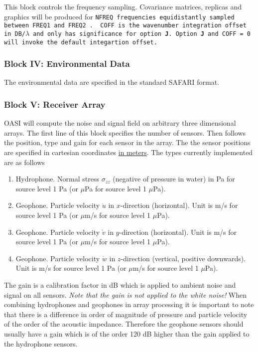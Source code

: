 This block controls the frequency sampling. Covariance matrices,
replicas and graphics will be produced for \tt NFREQ \rm frequencies
equidistantly sampled between \tt FREQ1 \rm and \tt FREQ2 \rm. \tt
COFF \rm is the wavenumber integration offset in DB/$\lambda$ and only
has significance for option {\bf J}. Option {\bf J} and \tt COFF = 0
\rm will invoke the default integartion offset.
 
\subsubsection{Block IV: Environmental Data }

The environmental data are specified in the standard SAFARI format.

\subsubsection{Block V: Receiver Array}

OASI will compute the noise and signal field on arbitrary
three dimensional arrays. The first line of this block specifies the
number of sensors. Then follows the position, type and gain for each
sensor in the array. The the sensor positions are specified in
cartesian coordinates \underline{in meters}. The types currently
implemented are as follows

\begin{enumerate}
\item Hydrophone. Normal stress $ \sigma_{zz}$ (negative of pressure in
water) in Pa for source level 1 Pa (or $\mu$Pa for source level 1 $\mu$Pa). 
\item Geophone. Particle velocity $\dot{u}$ in $x$-direction
(horizontal).  Unit is
m/s for source level 1 Pa (or $\mu$m/s for source level 1 $\mu$Pa).
\item Geophone. Particle velocity $\dot{v}$ in $y$-direction
(horizontal).  Unit is
m/s for source level 1 Pa (or $\mu$m/s for source level 1 $\mu$Pa).
\item Geophone. Particle velocity $\dot{w}$ in $z$-direction
(vertical, positive downwards).  Unit is
m/s for source level 1 Pa (or $\mu$m/s for source level 1 $\mu$Pa).
\end{enumerate}

The gain is a calibration factor in dB which is applied to
ambient noise and signal on all sensors. {\em Note that the gain is not
applied to the white noise!} When combining hydrophones and geophones
in array processing it is important to note that there is a  difference in
order of magnitude of pressure and particle velocity of the order of
the acoustic impedance. Therefore the geophone sensors should usually
have a gain which is of the order 120 dB higher than the gain applied to the
hydrophone sensors.

